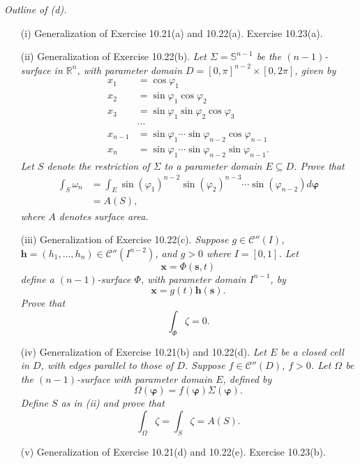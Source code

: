 \documentclass{article}
\begin{document}
\emph{Outline of (d).}
\begin{enumerate}
\item[(i)]
  Generalization of Exercise 10.21(a) and 10.22(a).
  Exercise 10.23(a).

\item[(ii)]
  Generalization of Exercise 10.22(b).
  \emph{Let $\Sigma = \mathbb{S}^{n-1}$ be the $(n-1)$-surface in $\mathbb{R}^n$,
  with parameter domain $D = [0,\pi]^{n-2} \times [0,2\pi]$,
  given by
  \begin{align*}
    x_1 &= \cos\varphi_1 \\
    x_2 &= \sin\varphi_1 \cos\varphi_2 \\
    x_3 &= \sin\varphi_1 \sin\varphi_2 \cos\varphi_3 \\
    & \cdots \\
    x_{n-1} &= \sin\varphi_1 \cdots \sin\varphi_{n-2} \cos\varphi_{n-1} \\
    x_n &= \sin\varphi_1 \cdots \sin\varphi_{n-2} \sin\varphi_{n-1}.
  \end{align*}
  Let $S$ denote the restriction of $\Sigma$ to a parameter domain $E \subseteq D$.
  Prove that
  \begin{align*}
    \int_{S} \omega_n
    &= \int_{E}  \sin(\varphi_1)^{n-2} \sin(\varphi_2)^{n-3} \cdots \sin(\varphi_{n-2})
      d\bm{\varphi} \\
    &= A(S),
  \end{align*}
  where $A$ denotes surface area.}

\item[(iii)]
  Generalization of Exercise 10.22(c).
  \emph{Suppose $g \in \mathscr{C}''(I)$,
  $\mathbf{h} = (h_1, \ldots, h_{n}) \in \mathscr{C}''(I^{n-2})$, and $g > 0$
  where $I = [0,1]$.
  Let
  \[
    \mathbf{x}
    = \Phi(\mathbf{s},t)
  \]
  define a $(n-1)$-surface $\Phi$, with parameter domain $I^{n-1}$, by
  \[
    \mathbf{x} = g(t)\mathbf{h}(\mathbf{s}).
  \]
  Prove that
  \[
    \int_{\Phi} \zeta = 0.
  \]}

\item[(iv)]
  Generalization of Exercise 10.21(b) and 10.22(d).
  \emph{Let $E$ be a closed cell in $D$,
  with edges parallel to those of $D$.
  Suppose $f \in \mathscr{C}''(D)$, $f > 0$.
  Let $\Omega$ be the $(n-1)$-surface with parameter domain $E$,
  defined by
  \[
    \Omega(\bm{\varphi}) = f(\bm{\varphi}) \Sigma(\bm{\varphi}).
  \]
  Define $S$ as in (ii) and prove that
  \[
    \int_{\Omega} \zeta = \int_{S} \zeta = A(S).
  \]}

\item[(v)]
  Generalization of Exercise 10.21(d) and 10.22(e).
  Exercise 10.23(b).


\end{enumerate}
\end{document}
